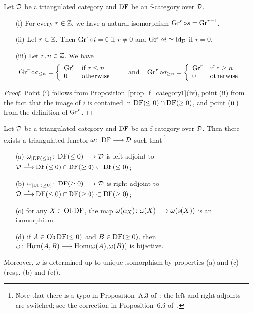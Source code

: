 \begin{proposition}
Let $\mathcal{D}$ be a triangulated category and $\operatorname{DF}$ be an f-category over $\mathcal{D}$. 
\begin{itemize}
\item[(i)] For every $r\in\mathbb{Z}$, we have a natural isomorphism $\operatorname{Gr}^r\circ s=\operatorname{Gr}^{r-1}$. 

\item[(ii)] Let $r\in\mathbb{Z}$. Then $\operatorname{Gr}^r\circ i=0$ if $r\ne 0$ and $\operatorname{Gr}^r\circ i\simeq\mathrm{id}_{\mathcal{D}}$ if $r=0$.

\item[(iii)] Let $r,n\in\mathbb{Z}$. We have
\[\operatorname{Gr}^r\circ\sigma_{\leq n}=\left\{\begin{array}{ll}\operatorname{Gr}^r& \mbox{if }r\leq  n\\ 0 & \mbox{otherwise}\end{array}\right.
\qquad\mbox{and}\quad\operatorname{Gr}^r\circ\sigma_{\geq n}=\left\{\begin{array}{ll}\operatorname{Gr}^r& \mbox{if }r\geq  n\\ 0 & \mbox{otherwise}\end{array}\right..\]

\end{itemize}
\label{prop_Gr}
\end{proposition}

\begin{proof}
Point (i) follows from Proposition~\ref{prop_f_category1}(iv), point (ii) from the fact that the image of $i$ is contained in $\operatorname{DF}(\leq 0)\cap\operatorname{DF}(\geq 0)$, and point (iii)
from the definition of $\operatorname{Gr}^r$.
\end{proof}

\begin{proposition}
Let $\mathcal{D}$ be a triangulated category and $\operatorname{DF}$ be an f-category over $\mathcal{D}$.
Then there exists a triangulated functor $\omega\colon \operatorname{DF}\longrightarrow\mathcal{D}$ such that:\footnote{Note that there is a typo in Proposition~A.3 of~\cite{Be1}: the left and right
adjoints are switched; see the correction in Proposition~6.6 of~\cite{Schnur}.}
\begin{itemize}
\item[(a)] $\omega_{\mid\operatorname{DF}(\leq 0)}\colon \operatorname{DF}(\leq 0)\longrightarrow\mathcal{D}$ is left adjoint to $\mathcal{D}\stackrel{i}{\longrightarrow}\operatorname{DF}(\leq 0)\cap\operatorname{DF}(\geq 0)\subset\operatorname{DF}(\leq 0)$;
\item[(b)] $\omega_{\mid\operatorname{DF}(\geq 0)}\colon \operatorname{DF}(\geq 0)\longrightarrow\mathcal{D}$ is right adjoint to $\mathcal{D}\stackrel{i}{\longrightarrow}\operatorname{DF}(\leq 0)\cap\operatorname{DF}(\geq 0)\subset\operatorname{DF}(\geq 0)$;
\item[(c)] for any $X\in\operatorname{\mathrm{Ob}}\operatorname{DF}$, the map $\omega(\alpha_X)\colon \omega(X)\longrightarrow\omega(s(X))$ is an isomorphism;
\item[(d)] if $A\in\operatorname{\mathrm{Ob}}\operatorname{DF}(\leq 0)$ and $B\in\operatorname{DF}(\geq 0)$, then $\omega\colon \operatorname{Hom}(A,B)\longrightarrow\operatorname{Hom}(\omega(A),\omega(B))$ is bijective.

\end{itemize}
Moreover, $\omega$ is determined up to unique isomorphism by properties (a) and (c) (resp. (b) and (c)).

\label{prop_f_category2}
\end{proposition}

